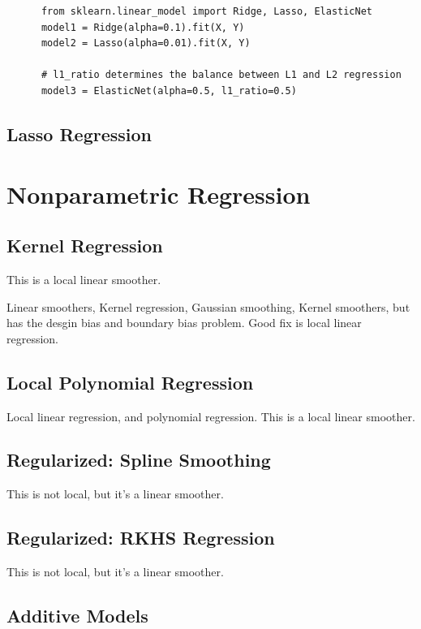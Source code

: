 \documentclass{article}
\begin{document}
    \begin{lstlisting}
      from sklearn.linear_model import Ridge, Lasso, ElasticNet
      model1 = Ridge(alpha=0.1).fit(X, Y) 
      model2 = Lasso(alpha=0.01).fit(X, Y)

      # l1_ratio determines the balance between L1 and L2 regression
      model3 = ElasticNet(alpha=0.5, l1_ratio=0.5) 
    \end{lstlisting}

  \subsection{Lasso Regression}

\section{Nonparametric Regression}

  \subsection{Kernel Regression}
    
    This is a local linear smoother. 

    Linear smoothers, Kernel regression, Gaussian smoothing, Kernel smoothers, but has the desgin bias and boundary bias problem. Good fix is local linear regression. 

  \subsection{Local Polynomial Regression}

    Local linear regression, and polynomial regression. This is a local linear smoother. 

  \subsection{Regularized: Spline Smoothing}

    This is not local, but it's a linear smoother. 

  \subsection{Regularized: RKHS Regression}

    This is not local, but it's a linear smoother. 

  \subsection{Additive Models}
  
\end{document}
